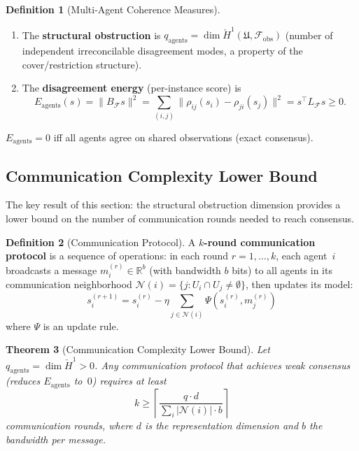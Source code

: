 \documentclass[11pt,a4paper]{article}
\theoremstyle{plain}
\newtheorem{theorem}{Theorem}[section]
\theoremstyle{definition}
\newtheorem{definition}[theorem]{Definition}
\theoremstyle{remark}
\newcommand{\R}{\mathbb{R}}
\newcommand{\cF}{\mathcal{F}}
\newcommand{\cN}{\mathcal{N}}
\newcommand{\fU}{\mathfrak{U}}
\newcommand{\CechH}{\check{H}}
\begin{document}
\begin{definition}[Multi-Agent Coherence Measures]\label{def:multi-coh}
\begin{enumerate}[label=(\roman*),nosep]
\item The \textbf{structural obstruction} is $q_{\mathrm{agents}} = \dim \CechH^1(\fU, \cF_{\mathrm{obs}})$ (number of independent irreconcilable disagreement modes, a property of the cover/restriction structure).
\item The \textbf{disagreement energy} (per-instance score) is
\[
E_{\mathrm{agents}}(s) = \|B_\cF s\|^2 = \sum_{(i,j)} \|\rho_{ij}(s_i) - \rho_{ji}(s_j)\|^2 = s^\top L_\cF s \geq 0.
\]
\end{enumerate}
$E_{\mathrm{agents}} = 0$ iff all agents agree on shared observations (exact consensus).
\end{definition}

\subsection{Communication Complexity Lower Bound}

The key result of this section: the structural obstruction dimension provides a lower bound on the number of communication rounds needed to reach consensus.

\begin{definition}[Communication Protocol]\label{def:comm-protocol}
A \textbf{$k$-round communication protocol} is a sequence of operations: in each round $r = 1, \ldots, k$, each agent~$i$ broadcasts a message $m_i^{(r)} \in \R^b$ (with bandwidth $b$ bits) to all agents in its communication neighborhood $\cN(i) = \{j : U_i \cap U_j \neq \emptyset\}$, then updates its model:
\[
s_i^{(r+1)} = s_i^{(r)} - \eta \sum_{j \in \cN(i)} \Psi(s_i^{(r)}, m_j^{(r)})
\]
where $\Psi$ is an update rule.
\end{definition}

\begin{theorem}[Communication Complexity Lower Bound]\label{thm:comm-complexity}
Let $q_{\mathrm{agents}} = \dim\CechH^1 > 0$. Any communication protocol that achieves weak consensus (reduces $E_{\mathrm{agents}}$ to~$0$) requires at least
\begin{equation}\label{eq:comm-bound}
k \geq \left\lceil\frac{q \cdot d}{\sum_{i} |\cN(i)| \cdot b}\right\rceil
\end{equation}
communication rounds, where $d$ is the representation dimension and $b$ the bandwidth per message.
\end{theorem}
\end{document}
